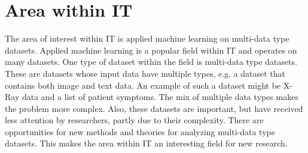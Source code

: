 \chapter{Area within IT}

The area of interest within IT is applied machine learning on multi-data type datasets.  Applied machine learning is a popular field within IT and operates on many datasets.  One type of dataset within the field is multi-data type datasets.  These are datasets whose input data have multiple types, e.g. a dataset that contains both image and text data.  An example of such a dataset might be X-Ray data and a list of patient symptoms.  The mix of multiple data types makes the problem more complex.  Also, these datasets are important, but have received less attention by researchers, partly due to their complexity.  There are opportunities for new methods and theories for analyzing multi-data type datasets.  This makes the area within IT an interesting field for new research.








